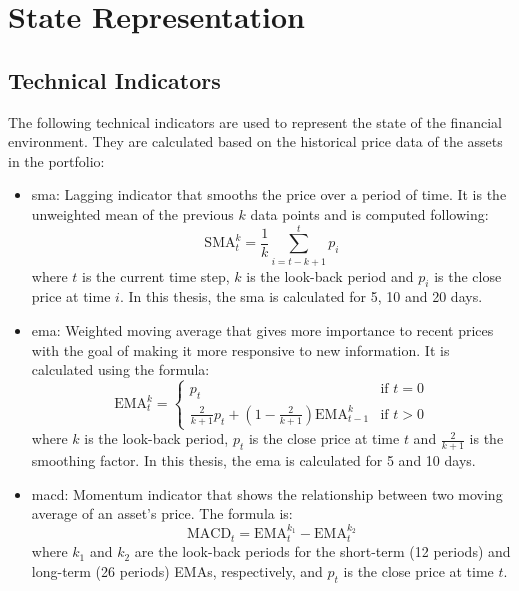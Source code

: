 \chapter{State Representation} \label{app:state_representation}

\section{Technical Indicators} \label{sec:technical-indicators}

The following technical indicators are used to represent the state of the financial environment. They are calculated based on the historical price data of the assets in the portfolio:

\begin{itemize}
    \item \acrfull{sma}: Lagging indicator that smooths the price over a period of time. It is the unweighted mean of the previous $k$ data points and is computed following:
    \begin{equation}
        \text{SMA}_t^k = \frac{1}{k} \sum_{i=t-k+1}^{t} p_{i}
    \end{equation}
    where $t$ is the current time step, $k$ is the look-back period and $p_i$ is the close price at time $i$.
    In this thesis, the \acrshort{sma} is calculated for 5, 10 and 20 days. 
    \item \acrfull{ema}: Weighted moving average that gives more importance to recent prices with the goal of making it more responsive to new information. It is calculated using the formula:
    \begin{equation}
        \text{EMA}_t^k = \begin{cases} p_t & \text{if } t = 0 \\ \frac{2}{k+1} p_t + \left(1 - \frac{2}{k+1}\right) \text{EMA}_{t-1}^{k} & \text{if } t > 0 \end{cases}
    \end{equation}
    where $k$ is the look-back period, $p_t$ is the close price at time $t$ and $\frac{2}{k+1}$ is the smoothing factor. In this thesis, the \acrshort{ema} is calculated for 5 and 10 days.
    \item \acrfull{macd}: Momentum indicator that shows the relationship between two moving average of an asset's price. The formula is:
    \begin{equation}
        \text{MACD}_t = \text{EMA}_t^{k_1} - \text{EMA}_t^{k_2}
    \end{equation}
    where $k_1$ and $k_2$ are the look-back periods for the short-term (12 periods) and long-term (26 periods) EMAs, respectively, and $p_t$ is the close price at time $t$.

\end{itemize}
